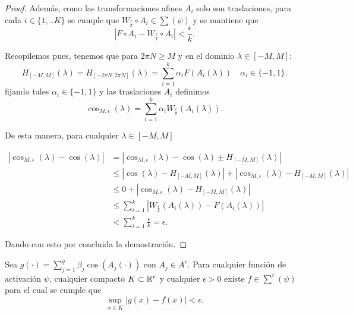 \begin{proof}
    Además, como las transformaciones afines $A_i$ solo son traslaciones,
    para cada $i \in \{1,..K\}$ se cumple que 
     $W_{ \frac{\epsilon}{k}} \circ A_i \in \sum(\psi)$ y se mantiene que 
    \begin{equation}
        |F \circ A_i - W_{ \frac{\epsilon}{k}} \circ A_i | < \frac{\epsilon}{k}. 
    \end{equation}


    Recopilemos pues, tenemos que para $2\pi N \geq M$ y en el dominio $\lambda \in [-M, M]$: 
    \begin{equation}
        H_{[-M, M]} (\lambda) = 
        H_{[-2\pi N, 2 \pi N]}(\lambda) = 
        \sum_{i=1}^k \alpha_i F( A_i(\lambda)) \quad \alpha_i \in \{-1,1\}.
    \end{equation}
    fijando tales $\alpha_i \in \{-1,1\}$ y las traslaciones $A_i$ definimos 
    \begin{equation}
        \cos_{M, \epsilon}(\lambda) = \sum_{i=1}^k 
        \alpha_i  W_{ \frac{\epsilon}{k}}(A_i(\lambda)). 
    \end{equation}

    De esta manera, para cualquier $\lambda \in [-M, M]$

    \begin{equation}
        \begin{split}
            |\cos_{M,\epsilon}(\lambda) - \cos(\lambda)| 
            &= |\cos_{M,\epsilon}(\lambda) - \cos(\lambda) \pm  H_{[- M, M]}(\lambda)| \\
            &\leq
            |\cos(\lambda) -  H_{[- M, M]}(\lambda)|
            + 
            | \cos_{M,\epsilon}(\lambda) -  H_{[- M, M]}(\lambda)|  \\
            &\leq  0 
            + | \cos_{M,\epsilon}(\lambda) -  H_{[- M, M]}(\lambda)| \\
            & \leq  \sum_{i=1}^k 
            |  W_{ \frac{\epsilon}{k}}(A_i(\lambda)) 
            -
            F( A_i(\lambda))
             | \\
             & <   \sum_{i=1}^k \frac{\epsilon}{k} = \epsilon .
        \end{split}
    \end{equation}

    Dando con esto por concluida la demostración. 
 
\end{proof}

\begin{lema}
    Sea $g(\cdot) = \sum_{j=1}^q \beta_j \cos(A_j(\cdot))$ con 
    $A_j \in A^r$. 
    Para cualquier función de activación $\psi$, 
    cualquier compacto $K \subset \mathbb{R}^r$
    y cualquier $\epsilon > 0$
    existe $f \in \sum^r(\psi)$ para el cual se cumple que 
    \begin{equation}
        \sup_{x \in K} 
        |g(x) - f(x)| < \epsilon.
    \end{equation}
\end{lema}

